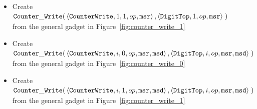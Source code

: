 \begin{itemize}
\begin{itemize}
        \item Create
        $\begin{aligned}[t]
            {\tt Counter\_Write}(& \left\langle {\tt CounterWrite}, 1, 1, op, {\tt msr} \right\rangle,
                      \left\langle {\tt DigitTop},     1,    op, {\tt msr} \right\rangle \;)
        \end{aligned}$ \\ from the general gadget in Figure~\ref{fig:counter_write_1}

        \item Create
        $\begin{aligned}[t]
            {\tt Counter\_Write}(& \left\langle {\tt CounterWrite}, i, 0, op, {\tt msr}, {\tt msd}\right\rangle,
                      \left\langle {\tt DigitTop},     i,    op, {\tt msr}, {\tt msd}\right\rangle \;)
        \end{aligned}$ \\ from the general gadget in Figure~\ref{fig:counter_write_0}

        \item Create
        $\begin{aligned}[t]
            {\tt Counter\_Write}(& \left\langle {\tt CounterWrite}, i, 1, op, {\tt msr}, {\tt msd}\right\rangle,
                      \left\langle {\tt DigitTop},     i,    op, {\tt msr}, {\tt msd}\right\rangle \;)
        \end{aligned}$ \\ from the general gadget in Figure~\ref{fig:counter_write_1}
    \end{itemize}

\end{itemize}

\vspace{.5cm}

